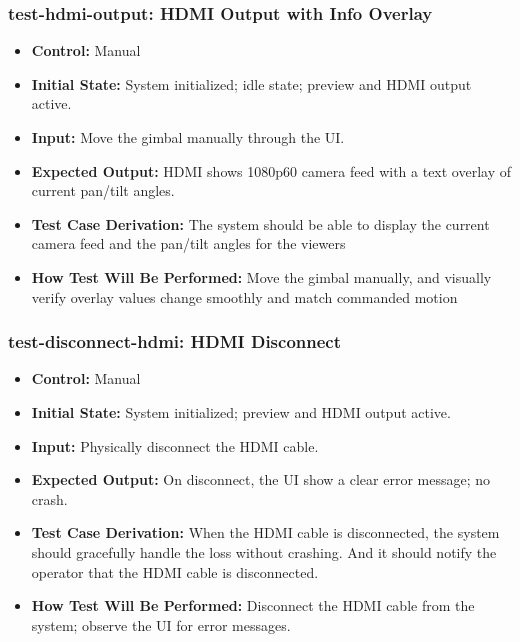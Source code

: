 \documentclass[12pt, titlepage]{article}
\begin{document}
\subsubsection*{test-hdmi-output: HDMI Output with Info Overlay}
\begin{itemize}
  \item \textbf{Control:} Manual
  \item \textbf{Initial State:} System initialized; idle state; preview and HDMI output active.
  \item \textbf{Input:} Move the gimbal manually through the UI.
  \item \textbf{Expected Output:} HDMI shows 1080p60 camera feed with a text overlay of current pan/tilt angles.
  \item \textbf{Test Case Derivation:} The system should be able to display the current camera feed and the pan/tilt angles for the viewers
  \item \textbf{How Test Will Be Performed:} Move the gimbal manually, and visually verify overlay values change smoothly and match commanded motion
\end{itemize}

\subsubsection*{test-disconnect-hdmi: HDMI Disconnect}
\begin{itemize}
  \item \textbf{Control:} Manual
  \item \textbf{Initial State:} System initialized; preview and HDMI output active.
  \item \textbf{Input:} Physically disconnect the HDMI cable.
  \item \textbf{Expected Output:} On disconnect, the UI show a clear error message; no crash.
  \item \textbf{Test Case Derivation:} When the HDMI cable is disconnected, the system should gracefully handle the loss without crashing. And it should notify the operator that the HDMI cable is disconnected.
  \item \textbf{How Test Will Be Performed:} Disconnect the HDMI cable from the system; observe the UI for error messages.
\end{itemize}
\end{document}
